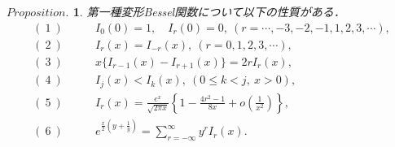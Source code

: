 \documentclass[a4j,papersize,disablejfam,slide,14pt]{jsarticle}
\newtheorem{Prop}{$Proposition.$}
\def\exp#1{e^{#1}} %
\begin{document}
	\begin{screen}
		\begin{Prop}
    		第一種変形{\rm Bessel}関数について以下の性質がある．
        	\begin{align}
        		(\ 1\ ) &\qquad I_0(0) = 1,\quad I_r(0) = 0,\ (r = \cdots, -3, -2, -1, 1, 2, 3,\cdots), \\
            	(\ 2\ ) &\qquad I_r(x) = I_{-r}(x),\ (r = 0,1,2,3,\cdots), \\
            	(\ 3\ ) &\qquad x\{I_{r-1}(x) - I_{r+1}(x)\} = 2rI_r(x), \\
            	(\ 4\ ) &\qquad I_j(x) < I_k(x),\ (0 \leq k < j,\ x > 0), \\
            	(\ 5\ ) &\qquad I_r(x) = \frac{\exp{x}}{\sqrt{2 \pi x}} \left\{ 1-\frac{4r^2 - 1}{8x} + o\left( \frac{1}{x^2} \right) \right\}, \\
                (\ 6\ ) &\qquad \exp{\frac{x}{2}\left(y + \frac{1}{y}\right)} = \sum_{r=-\infty}^{\infty} y^rI_r(x). 
        	\end{align}
    	\end{Prop}
    \end{screen}
\end{document}
